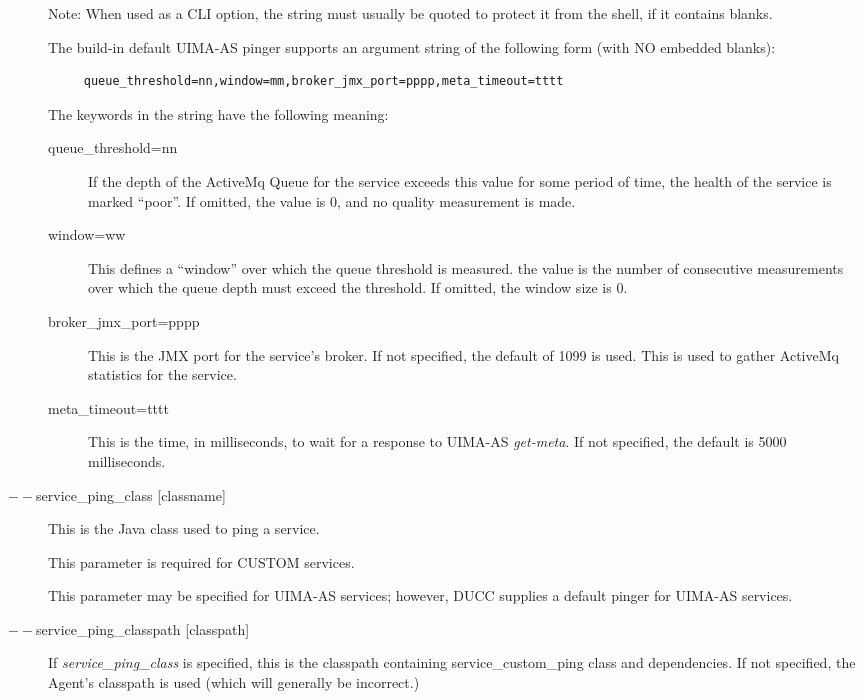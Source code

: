 \begin{description}
        Note: When used as a CLI option, the string must usually be
        quoted to protect it from the shell, if it contains blanks.

        The build-in default UIMA-AS pinger supports an argument string of the following form
        (with NO embedded blanks):
\begin{verbatim}
     queue_threshold=nn,window=mm,broker_jmx_port=pppp,meta_timeout=tttt
\end{verbatim}
        
        The keywords in the string have the following meaning:
        \begin{description}
          \item[queue\_threshold=nn] If the depth of the ActiveMq Queue for the service exceeds
            this value for some period of time, the health of the service is marked ``poor''.
            If omitted, the value is 0, and no quality measurement is made.
          \item[window=ww] This defines a ``window'' over which the queue threshold is measured.
            the value is the number of consecutive measurements over which the queue depth must
            exceed the threshold.  If omitted, the window size is 0.
          \item[broker\_jmx\_port=pppp] This is the JMX port for the service's broker.  If not
            specified, the default of 1099 is used.  This is used to gather ActiveMq statistics
            for the service.
          \item[meta\_timeout=tttt] This is the time, in milliseconds, to wait for a response
            to UIMA-AS {\em get-meta}.  If not specified, the default is 5000 milliseconds.
        \end{description}
      
      \item[$--$service\_ping\_class {[classname]}] This is the Java class used to ping a service. 

        This parameter is required for CUSTOM services.

        This parameter may be specified for UIMA-AS services; however, DUCC supplies a default
        pinger for UIMA-AS services.

      \item[$--$service\_ping\_classpath {[classpath]}] If {\em service\_ping\_class} is specified,
        this is the classpath containing service\_custom\_ping class and dependencies.  If not
        specified, the Agent's classpath is used (which will generally be incorrect.)


\end{description}
